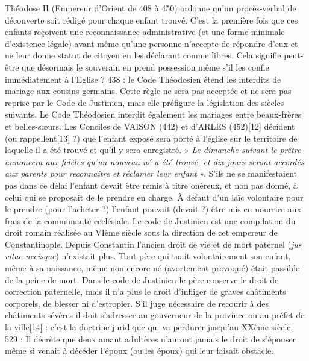  Théodose II (Empereur d'Orient de 408 à 450) ordonne qu'un procès-verbal de découverte soit rédigé pour chaque enfant trouvé. C'est la première fois que ces enfants reçoivent une reconnaissance administrative (et une forme minimale d'existence légale) avant même qu'une personne n'accepte de répondre d'eux et ne leur donne statut de citoyen en les déclarant comme libres. Cela signifie peut-être que désormais le souverain en prend possession même s'il les confie immédiatement à l'Eglise ? 
 438 : le Code Théodosien étend les interdits de mariage aux cousins germains. Cette règle ne sera pas acceptée et ne sera pas reprise par le Code de Justinien, mais elle préfigure la législation des siècles suivants. Le Code Théodosien interdit également les mariages entre beaux-frères et belles-sœurs.
 Les Conciles de VAISON (442) et d'ARLES (452)[12] décident (ou rappellent[13] ?) que l'enfant exposé sera porté à l'église sur le territoire de laquelle il a été trouvé et qu'il y sera enregistré. » \emph{Le dimanche suivant le prêtre annoncera aux fidèles qu'un nouveau-né a été trouvé, et dix jours seront accordés aux parents pour reconnaître et réclamer leur enfant} ». S'ils ne se manifestaient pas dans ce délai l'enfant devait être remis à titre onéreux, et non pas donné, à celui qui se proposait de le prendre en charge. À défaut d'un laïc volontaire pour le prendre (pour l'acheter ?) l'enfant pouvait (devait ?) être mis en nourrice aux frais de la communauté ecclésiale. 
 Le code de Justinien est une compilation du droit romain réalisée au VIème siècle sous la direction de cet empereur de Constantinople. Depuis Constantin l'ancien droit de vie et de mort paternel (\emph{jus vitae necisque}) n'existait plus. Tout père qui tuait volontairement son enfant, même à sa naissance, même non encore né (avortement provoqué) était passible de la peine de mort. Dans le code de Justinien le père conserve le droit de correction paternelle, mais il n'a plus le droit d'infliger de graves châtiments corporels, de blesser ni d'estropier. S'il juge nécessaire de recourir à des châtiments sévères il doit s'adresser au gouverneur de la province ou au préfet de la ville[14] : c'est la doctrine juridique qui va perdurer jusqu'au XXème siècle. 
 529 : Il décrète que deux amant adultères n'auront jamais le droit de s'épouser même si venait à décéder l'époux (ou les époux) qui leur faisait obstacle.

